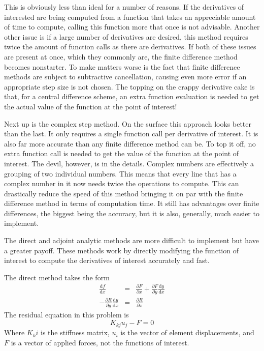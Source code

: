 \documentclass[12pt,parskip=full]{article}
\numberwithin{subsection}{section}
\begin{document}
		This is obviously less than ideal for a number of reasons. If the derivatives of interested are being computed from a function that 
		takes an appreciable amount of time to compute, calling this function more that once is not advisable. Another other issue is if a
		large number of derivatives are desired, this method requires twice the amount of function calls as there are derivatives. If 
		both of these issues are present at once, which they commonly are, the finite difference method becomes nonstarter. To make matters 
		worse is the fact that finite difference methods are subject to subtractive cancellation, causing even more error if an appropriate 
		step size is not chosen. The topping on the crappy derivative cake is that, for a central difference scheme, an extra function
		evaluation is needed to get the actual value of the function at the point of interest!
		
		Next up is the complex step method. On the surface this approach looks better than the last. It only requires a single function call
		per derivative of interest. It is also far more accurate than any finite difference method can be. To top it off, no extra function
		call is needed to get the value of the function at the point of interest. The devil, however, is in the details. Complex numbers are
		effectively a grouping of two individual numbers. This means that every line that has a complex number in it now needs twice the
		operations to compute. This can drastically reduce the speed of this method bringing it on par with the finite difference method in
		terms of computation time. It still has advantages over finite differences, the biggest being the accuracy, but it is also, generally,
		much easier to implement.
		
		The direct and adjoint analytic methods are more difficult to implement but have a greater payoff. These methods work by directly
		modifying the function of interest to compute the derivatives of interest accurately and fast.
		
		The direct method takes the form
		\begin{eqnarray}
			\frac{\mathrm{d}f}{\mathrm{d}x} &=& \frac{\partial F}{\partial x} + \frac{\partial F}{\partial y}\frac{\mathrm{d}y}{\mathrm{d}x} \\
			-\frac{\partial R}{\partial y}\frac{\mathrm{d}y}{\mathrm{d}x} &=& \frac{\partial R}{\partial x}
		\end{eqnarray}
		The residual equation in this problem is
		\begin{equation}
			K_{kj}u_j - F = 0
		\end{equation}
		Where $K_ki$ is the stiffness matrix, $u_i$ is the vector of element displacements, and $F$ is a vector of applied forces, not the
		functions of interest.
		
\end{document}

